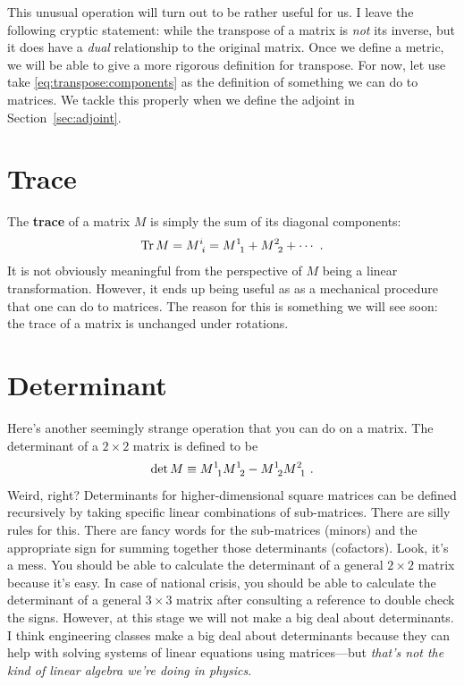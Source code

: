\documentclass[12pt, oneside]{report}    %
\let\oldsection\section
\def\section{%
  \setcounter{sidenote}{1}%
  \oldsection
}
\begin{document}
\begin{subappendices}
This unusual operation will turn out to be rather useful for us. I leave the following cryptic statement: while the transpose of a matrix is \emph{not} its inverse, but it does have a \emph{dual} relationship to the original matrix. Once we define a metric, we will be able to give a more rigorous definition for transpose. For now, let use take \eqref{eq:transpose:components} as the definition of something we can do to matrices. We tackle this properly when we define the adjoint in Section~\ref{sec:adjoint}.


\section{Trace}

The \textbf{trace} of a matrix $M$ is simply the sum of its diagonal components:
\begin{align}
    \Tr M = M\aij{i}{i} = M\aij{1}{1} + M\aij{2}{2} + \cdots \ .
\end{align}
It is not obviously meaningful from the perspective of $M$ being a linear transformation. However, it ends up being useful as as a mechanical procedure that one can do to matrices. The reason for this is something we will see soon: the trace of a matrix is unchanged under rotations. 

\section{Determinant}
\label{sec:determinants:easy}


Here's another seemingly strange operation that you can do on a matrix. The determinant of a $2\times 2$ matrix is defined to be
\begin{align}
    \det M \equiv M\aij11 M\aij12 - M\aij12 M\aij21 \ .
\end{align}
Weird, right? Determinants for higher-dimensional square matrices can be defined recursively by taking specific linear combinations of sub-matrices. There are silly rules for this. There are fancy words for the sub-matrices (minors) and the appropriate sign for summing together those determinants (cofactors). Look, it's a mess. You should be able to calculate the determinant of a general $2\times 2$ matrix because it's easy. In case of national crisis, you should be able to calculate the determinant of a general $3\times 3$ matrix after consulting a reference to double check the signs. However, at this stage we will not make a big deal about determinants. I think engineering classes make a big deal about determinants because they can help with solving systems of linear equations using matrices---but \emph{that's not the kind of linear algebra we're doing in physics}.


\end{subappendices}
\end{document}
